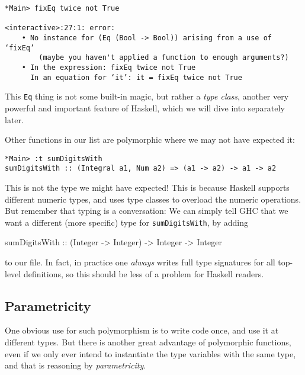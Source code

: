 \documentclass[11pt,
  american,
  DIV13]{article}
\newenvironment{Shaded}{}{}
\newcommand{\DataTypeTok}[1]{\textcolor[rgb]{0.56,0.13,0.00}{#1}}
\newcommand{\NormalTok}[1]{#1}
\newcommand{\OtherTok}[1]{\textcolor[rgb]{0.00,0.44,0.13}{#1}}
\begin{document}
\begin{verbatim}
*Main> fixEq twice not True

<interactive>:27:1: error:
    • No instance for (Eq (Bool -> Bool)) arising from a use of ‘fixEq’
        (maybe you haven't applied a function to enough arguments?)
    • In the expression: fixEq twice not True
      In an equation for ‘it’: it = fixEq twice not True
\end{verbatim}

This \texttt{Eq} thing is not some built-in magic, but rather a
\emph{type class}, another very powerful and important feature of
Haskell, which we will dive into separately later.

Other functions in our list are polymorphic where we may not have
expected it:

\begin{verbatim}
*Main> :t sumDigitsWith
sumDigitsWith :: (Integral a1, Num a2) => (a1 -> a2) -> a1 -> a2
\end{verbatim}

This is not the type we might have expected! This is because Haskell
supports different numeric types, and uses type classes to overload the
numeric operations. But remember that typing is a conversation: We can
simply tell GHC that we want a different (more specific) type for
\texttt{sumDigitsWith}, by adding

\begin{Shaded}
\begin{Highlighting}[]
\OtherTok{sumDigitsWith ::}\NormalTok{ (}\DataTypeTok{Integer} \OtherTok{{-}\textgreater{}} \DataTypeTok{Integer}\NormalTok{) }\OtherTok{{-}\textgreater{}} \DataTypeTok{Integer} \OtherTok{{-}\textgreater{}} \DataTypeTok{Integer}
\end{Highlighting}
\end{Shaded}

to our file. In fact, in practice one \emph{always} writes full type
signatures for all top-level definitions, so this should be less of a
problem for Haskell readers.

\hypertarget{parametricity}{%
\subsection{Parametricity}\label{parametricity}}

One obvious use for such polymorphism is to write code once, and use it
at different types. But there is another great advantage of polymorphic
functions, even if we only ever intend to instantiate the type variables
with the same type, and that is reasoning by \emph{parametricity}.
\end{document}
